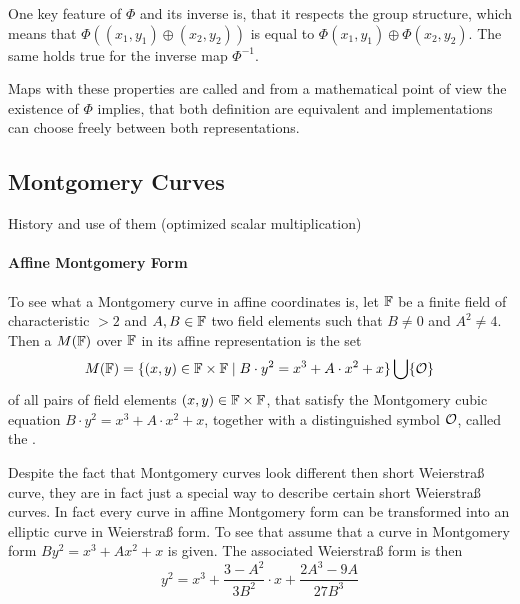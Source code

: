 One key feature of $\Phi$ and its inverse is, that it respects the group structure, which means that $\Phi((x_1,y_1)\oplus (x_2,y_2))$ is equal to $\Phi(x_1,y_1)\oplus \Phi(x_2,y_2)$. The same holds true for the inverse map $\Phi^{-1}$.

Maps with these properties are called  and from a mathematical point of view the existence of $\Phi$ implies, that both definition are equivalent and implementations can choose freely between both representations. 


\subsection{Montgomery Curves}
History and use of them (optimized scalar multiplication)

\paragraph{Affine Montgomery Form}
To see what a Montgomery curve in affine coordinates is, let $\mathbb{F}$ be a finite field of characteristic $>2$ and $A,B\in \mathbb{F}$ two field elements such that $B\neq 0$ and $A^2 \neq 4$. Then a  $M(\mathbb{F})$ over $\mathbb{F}$ in its affine representation is the set
\begin{equation}
\label{def_short_weierstrass_curve}
M(\mathbb{F}) = \{(x,y)\in \mathbb{F}\times \mathbb{F}\;|\; B\cdot y^2 = x^3 + A\cdot x^2 + x  \} \bigcup \{\mathcal{O}\}
\end{equation}
of all pairs of field elements $(x,y)\in \mathbb{F}\times \mathbb{F}$, that satisfy the Montgomery cubic equation $B\cdot y^2 = x^3 + A\cdot x^2 + x$, together with a distinguished symbol $\mathcal{O}$, called the .

Despite the fact that Montgomery curves look different then short Weierstraß curve, they are in fact just a special way to describe certain short Weierstraß curves. In fact every curve in affine Montgomery form can be transformed into an elliptic curve in Weierstraß form. To see that assume that a curve in Montgomery form $B y^2 = x^3 + A x^2 + x$ is given. The associated Weierstraß form is then
$$
y^2 = x^3 + \frac{3-A^2}{3B^2}\cdot x + \frac{2A^3-9A}{27B^3}
$$
 
